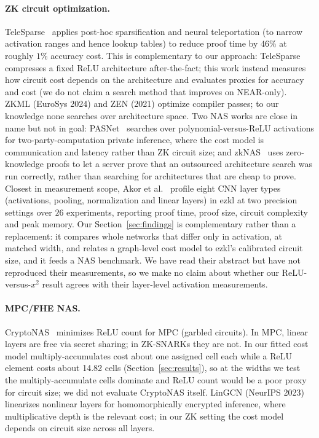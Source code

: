\documentclass[10pt]{article}
\begin{document}
\paragraph{ZK circuit optimization.}
TeleSparse~\citep{maheri2025telesparse} applies post-hoc sparsification and
neural teleportation (to narrow activation ranges and hence lookup tables) to reduce
proof time by $46\%$ at roughly $1\%$ accuracy cost.  This is complementary to
our approach: TeleSparse compresses a fixed ReLU architecture after-the-fact;
this work instead measures how circuit cost depends on the architecture and evaluates proxies for accuracy and cost (we do not claim a search method that improves on NEAR-only).  ZKML
(EuroSys 2024) and ZEN (2021) optimize compiler passes; to our knowledge none
searches over architecture space.  Two NAS works are close in name but not in
goal: PASNet~\citep{peng2023pasnet} searches over polynomial-versus-ReLU activations
for two-party-computation private inference, where the cost model is
communication and latency rather than ZK circuit size; and
zkNAS~\citep{wang2026zknas} uses zero-knowledge proofs to let a server prove
that an outsourced architecture search was run correctly, rather than searching for
architectures that are cheap to prove.  Closest in measurement scope, Akor et
al.~\citep{akor2026ezklcnn} profile eight CNN layer types (activations, pooling, normalization and linear
layers) in ezkl at two precision settings over $26$ experiments, reporting proof time, proof size, circuit
complexity and peak memory.  Our Section~\ref{sec:findings} is complementary rather than a replacement:
it compares whole networks that differ only in activation, at matched width, and relates a graph-level
cost model to ezkl's calibrated circuit size, and it feeds a NAS benchmark.  We have read their abstract
but have not reproduced their measurements, so we make no claim about whether our ReLU-versus-$x^2$ result
agrees with their layer-level activation measurements.

\paragraph{MPC/FHE NAS.}
CryptoNAS~\citep{ghodsi2020cryptonas} minimizes ReLU count for MPC (garbled circuits).  In MPC, linear layers are free via
secret sharing; in ZK-SNARKs they are not.  In our fitted cost model multiply-accumulates cost about one assigned cell each
while a ReLU element costs about 14.82 cells (Section~\ref{sec:results}), so at the widths we test the multiply-accumulate cells dominate and ReLU count would be a poor proxy for
circuit size; we did not evaluate CryptoNAS itself.  LinGCN (NeurIPS 2023) linearizes nonlinear layers for homomorphically encrypted
inference, where multiplicative depth is the relevant cost; in our ZK setting the cost model depends on circuit size across all layers.
\end{document}
